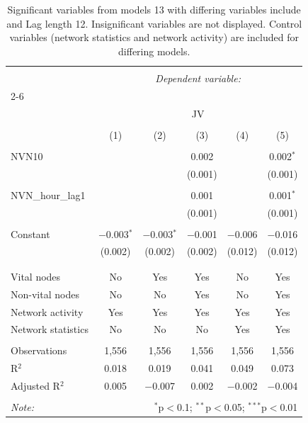 
\begin{table}[!htbp] \centering 
  \caption{Significant variables from models 13 with differing variables include 
                               and Lag length 12. Insignificant variables are not displayed. 
                               Control variables (network statistics and network activity) are 
                               included for differing models.} 
  \label{Jmodels1_5min_t} 
\scriptsize 
\begin{tabular}{@{\extracolsep{5pt}}lccccc} 
\\[-1.8ex]\hline 
\hline \\[-1.8ex] 
 & \multicolumn{5}{c}{\textit{Dependent variable:}} \\ 
\cline{2-6} 
\\[-1.8ex] & \multicolumn{5}{c}{JV} \\ 
\\[-1.8ex] & (1) & (2) & (3) & (4) & (5)\\ 
\hline \\[-1.8ex] 
 NVN10 &  &  & 0.002 &  & 0.002$^{*}$ \\ 
  &  &  & (0.001) &  & (0.001) \\ 
  & & & & & \\ 
 NVN\_hour\_lag1 &  &  & 0.001 &  & 0.001$^{*}$ \\ 
  &  &  & (0.001) &  & (0.001) \\ 
  & & & & & \\ 
 Constant & $-$0.003$^{*}$ & $-$0.003$^{*}$ & $-$0.001 & $-$0.006 & $-$0.016 \\ 
  & (0.002) & (0.002) & (0.002) & (0.012) & (0.012) \\ 
  & & & & & \\ 
\hline \\[-1.8ex] 
Vital nodes & No & Yes & Yes & No & Yes \\ 
Non-vital nodes & No & No & Yes & No & Yes \\ 
Network activity & Yes & Yes & Yes & Yes & Yes \\ 
Network statistics & No & No & No & Yes & Yes \\ 
\hline &  &  &  &  &  \\ 
Observations & 1,556 & 1,556 & 1,556 & 1,556 & 1,556 \\ 
R$^{2}$ & 0.018 & 0.019 & 0.041 & 0.049 & 0.073 \\ 
Adjusted R$^{2}$ & 0.005 & $-$0.007 & 0.002 & $-$0.002 & $-$0.004 \\ 
\hline 
\hline \\[-1.8ex] 
\textit{Note:}  & \multicolumn{5}{r}{$^{*}$p$<$0.1; $^{**}$p$<$0.05; $^{***}$p$<$0.01} \\ 
\end{tabular} 
\end{table} 
